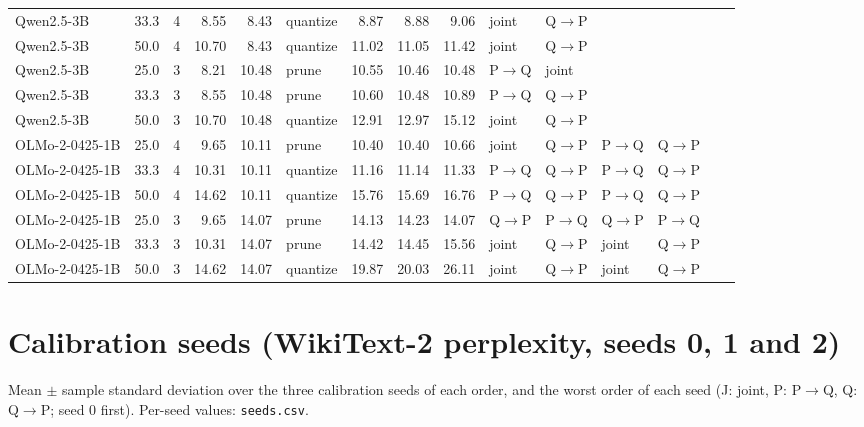 \documentclass{article}
\begin{document}
\begin{longtable}{lrrrrlrrrllllll}
Qwen2.5-3B & 33.3 & 4 & 8.55 & 8.43 & quantize & 8.87 & 8.88 & 9.06 & joint & Q$\to$P &  &  &  &  \\
Qwen2.5-3B & 50.0 & 4 & 10.70 & 8.43 & quantize & 11.02 & 11.05 & 11.42 & joint & Q$\to$P &  &  &  &  \\
Qwen2.5-3B & 25.0 & 3 & 8.21 & 10.48 & prune & 10.55 & 10.46 & 10.48 & P$\to$Q & joint &  &  &  &  \\
Qwen2.5-3B & 33.3 & 3 & 8.55 & 10.48 & prune & 10.60 & 10.48 & 10.89 & P$\to$Q & Q$\to$P &  &  &  &  \\
Qwen2.5-3B & 50.0 & 3 & 10.70 & 10.48 & quantize & 12.91 & 12.97 & 15.12 & joint & Q$\to$P &  &  &  &  \\
OLMo-2-0425-1B & 25.0 & 4 & 9.65 & 10.11 & prune & 10.40 & 10.40 & 10.66 & joint & Q$\to$P & P$\to$Q & Q$\to$P &  &  \\
OLMo-2-0425-1B & 33.3 & 4 & 10.31 & 10.11 & quantize & 11.16 & 11.14 & 11.33 & P$\to$Q & Q$\to$P & P$\to$Q & Q$\to$P &  &  \\
OLMo-2-0425-1B & 50.0 & 4 & 14.62 & 10.11 & quantize & 15.76 & 15.69 & 16.76 & P$\to$Q & Q$\to$P & P$\to$Q & Q$\to$P &  &  \\
OLMo-2-0425-1B & 25.0 & 3 & 9.65 & 14.07 & prune & 14.13 & 14.23 & 14.07 & Q$\to$P & P$\to$Q & Q$\to$P & P$\to$Q &  &  \\
OLMo-2-0425-1B & 33.3 & 3 & 10.31 & 14.07 & prune & 14.42 & 14.45 & 15.56 & joint & Q$\to$P & joint & Q$\to$P &  &  \\
OLMo-2-0425-1B & 50.0 & 3 & 14.62 & 14.07 & quantize & 19.87 & 20.03 & 26.11 & joint & Q$\to$P & joint & Q$\to$P &  &  \\
\bottomrule\end{longtable}
\clearpage\section*{Calibration seeds (WikiText-2 perplexity, seeds 0, 1 and 2)}
Mean $\pm$ sample standard deviation over the three calibration seeds of each order, and the worst order of each seed (J: joint, P: P$\to$Q, Q: Q$\to$P; seed 0 first). Per-seed values: \texttt{seeds.csv}.
\end{document}
